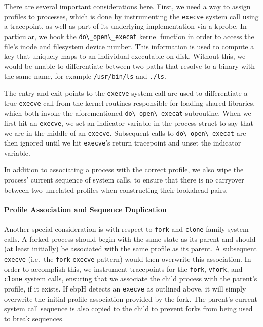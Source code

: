 \documentclass[
  12pt]{findlay}
\newcommand{\passthrough}[1]{#1}
\begin{document}
There are several important considerations here. First, we need a way to
assign profiles to processes, which is done by instrumenting the
\passthrough{\lstinline!execve!} system call using a tracepoint, as well
as part of its underlying implementation via a kprobe. In particular, we
hook the \passthrough{\lstinline!do\_open\_execat!} kernel function in
order to access the file's inode and filesystem device number. This
information is used to compute a key that uniquely maps to an individual
executable on disk. Without this, we would be unable to differentiate
between two paths that resolve to a binary with the same name, for
example \passthrough{\lstinline!/usr/bin/ls!} and
\passthrough{\lstinline!./ls!}.

The entry and exit points to the \passthrough{\lstinline!execve!} system
call are used to differentiate a true \passthrough{\lstinline!execve!}
call from the kernel routines responsible for loading shared libraries,
which both invoke the aforementioned
\passthrough{\lstinline!do\_open\_execat!} subroutine. When we first hit
an \passthrough{\lstinline!execve!}, we set an indicator variable in the
process struct to say that we are in the middle of an
\passthrough{\lstinline!execve!}. Subsequent calls to
\passthrough{\lstinline!do\_open\_execat!} are then ignored until we hit
\passthrough{\lstinline!execve!}'s return tracepoint and unset the
indicator variable.

In addition to associating a process with the correct profile, we also
wipe the process' current sequence of system calls, to ensure that there
is no carryover between two unrelated profiles when constructing their
lookahead pairs.

\hypertarget{profile-association-and-sequence-duplication}{%
\paragraph{Profile Association and Sequence
Duplication}\label{profile-association-and-sequence-duplication}}

Another special consideration is with respect to
\passthrough{\lstinline!fork!} and \passthrough{\lstinline!clone!}
family system calls. A forked process should begin with the same state
as its parent and should (at least initially) be associated with the
same profile as its parent. A subsequent
\passthrough{\lstinline!execve!} (i.e.~the
\passthrough{\lstinline!fork!}-\passthrough{\lstinline!execve!} pattern)
would then overwrite this association. In order to accomplish this, we
instrument tracepoints for the \passthrough{\lstinline!fork!},
\passthrough{\lstinline!vfork!}, and \passthrough{\lstinline!clone!}
system calls, ensuring that we associate the child process with the
parent's profile, if it exists. If ebpH detects an
\passthrough{\lstinline!execve!} as outlined above, it will simply
overwrite the initial profile association provided by the fork. The
parent's current system call sequence is also copied to the child to
prevent forks from being used to break sequences.
\end{document}
